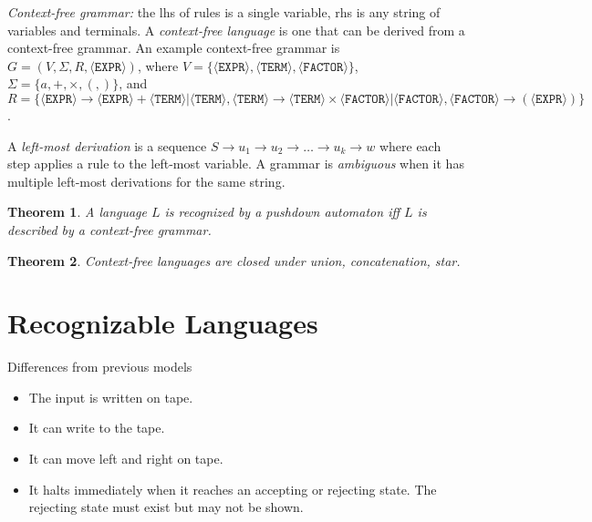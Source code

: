 \documentclass[letterpaper,landscape,11pt]{article}
\newtheorem{theorem}{Theorem}
\begin{document}
\emph{Context-free grammar:} the lhs of rules is a single variable, rhs is any string of variables and terminals. A \emph{context-free language} is one that can be derived from a context-free grammar. An example context-free grammar is $G = (V, \Sigma, R, \langle \texttt{EXPR} \rangle)$, where $V = \{\langle \texttt{EXPR} \rangle, \langle \texttt{TERM} \rangle, \langle \texttt{FACTOR} \rangle\}$, $\Sigma = \{a, +, \times, (, )\}$, and $R = \{\langle \texttt{EXPR} \rangle \rightarrow \langle \texttt{EXPR} \rangle + \langle \texttt{TERM} \rangle | \langle \texttt{TERM} \rangle, \langle \texttt{TERM} \rangle \rightarrow \langle \texttt{TERM} \rangle \times \langle \texttt{FACTOR} \rangle | \langle \texttt{FACTOR} \rangle, \langle \texttt{FACTOR} \rangle \rightarrow (\langle \texttt{EXPR} \rangle)\}$.

A \emph{left-most derivation} is a sequence $S \rightarrow u_1 \rightarrow u_2 \rightarrow \dots \rightarrow u_k \rightarrow w$ where each step applies a rule to the left-most variable. A grammar is \emph{ambiguous} when it has multiple left-most derivations for the same string.

\begin{theorem}
	A language $L$ is recognized by a pushdown automaton iff $L$ is described by a context-free grammar.
\end{theorem}

\begin{theorem}
	Context-free languages are closed under union, concatenation, star.
\end{theorem}

\section{Recognizable Languages}
Differences from previous models
\begin{itemize}
	\item The input is written on tape.
	\item It can write to the tape.
	\item It can move left and right on tape.
	\item It halts immediately when it reaches an accepting or rejecting state. The rejecting state must exist but may not be shown.
\end{itemize}
\end{document}
